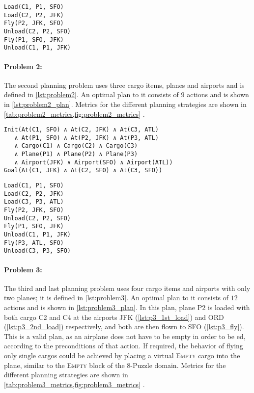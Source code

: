 \documentclass[12pt, a4paper, oneside]{article}
\newcommand{\literal}[1]{{\color{sepia}{\textsc{#1}}}}
\begin{document}
\begin{lstlisting}[caption=Problem 1 optimal plan,label=lst:problem1_plan]
Load(C1, P1, SFO)
Load(C2, P2, JFK)
Fly(P2, JFK, SFO)
Unload(C2, P2, SFO)
Fly(P1, SFO, JFK)
Unload(C1, P1, JFK)
\end{lstlisting}

\paragraph{Problem 2:} The second planning problem uses three cargo items, planes and airports and is defined in \cref{lst:problem2}. An optimal plan to it consists of $9$ actions and is shown in \cref{lst:problem2_plan}.
Metrics for the different planning strategies are shown in \cref{tab:problem2_metrics,fig:problem2_metrics} .

\begin{lstlisting}[caption=Problem 2 initial state and goal,label=lst:problem2]
Init(At(C1, SFO) ∧ At(C2, JFK) ∧ At(C3, ATL) 
   ∧ At(P1, SFO) ∧ At(P2, JFK) ∧ At(P3, ATL) 
   ∧ Cargo(C1) ∧ Cargo(C2) ∧ Cargo(C3)
   ∧ Plane(P1) ∧ Plane(P2) ∧ Plane(P3)
   ∧ Airport(JFK) ∧ Airport(SFO) ∧ Airport(ATL))
Goal(At(C1, JFK) ∧ At(C2, SFO) ∧ At(C3, SFO))
\end{lstlisting}

\begin{lstlisting}[caption=Problem 2 optimal plan,label=lst:problem2_plan]
Load(C1, P1, SFO)
Load(C2, P2, JFK)
Load(C3, P3, ATL)
Fly(P2, JFK, SFO)
Unload(C2, P2, SFO)
Fly(P1, SFO, JFK)
Unload(C1, P1, JFK)
Fly(P3, ATL, SFO)
Unload(C3, P3, SFO)
\end{lstlisting}

\paragraph{Problem 3:} The third and last planning problem uses four cargo items and airports with only two planes; it is defined in \cref{lst:problem3}. An optimal plan to it consists of $12$ actions and is shown in \cref{lst:problem3_plan}.
In this plan, plane \textsc{P2} is loaded with both cargo \textsc{C2} and \textsc{C4} at
the airports \textsc{JFK} (\cref{lst:p3_1st_load}) and \textsc{ORD} (\cref{lst:p3_2nd_load}) respectively, and both are then flown to \textsc{SFO} (\cref{lst:p3_fly}).
This is a valid plan, as an airplane does not have to be empty in order to be \literal{Load}ed,
according to the preconditions of that action. If required, the behavior of flying
only single cargos could be achieved by placing a virtual \textsc{Empty} cargo into the plane,
similar to the \textsc{Empty} block of the 8-Puzzle domain.
Metrics for the different planning strategies are shown in \cref{tab:problem3_metrics,fig:problem3_metrics} .
\end{document}
